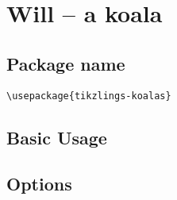 \documentclass[parskip=half]{scrartcl}
\begin{document}
\begin{tcblisting}{}
\coati[body=SteelBlue]
\end{tcblisting}

\begin{tcblisting}{}
\coati[rotatehead=-15]
\end{tcblisting}

\begin{tcblisting}{}
\coati[sideward]
\end{tcblisting}

\begin{tcblisting}{}
\coati[3D]
\end{tcblisting}


\clearpage
\section{Will -- a koala}

\subsection{Package name}

\begin{tcolorbox}
\vspace*{0.5cm}
\lstinline|\usepackage{tikzlings-koalas}|
\vspace*{0.5cm}
\end{tcolorbox}

\subsection{Basic Usage}

\begin{tcblisting}{}
\koala
\end{tcblisting}

\subsection{Options}

\begin{tcblisting}{}
\koala[body=SteelBlue]
\end{tcblisting}

\begin{tcblisting}{}
\koala[blush]
\end{tcblisting}

\begin{tcblisting}{}
\koala[sleeping]
\end{tcblisting}
\end{document}
